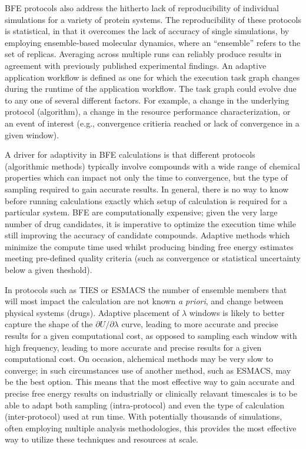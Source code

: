 \documentclass[11pt]{article}
\begin{document}
BFE protocols also address the hitherto lack of reproducibility of
individual simulations for a variety of protein systems. The
reproducibility of these protocols is statistical, in that it
overcomes the lack of accuracy of single simulations, by employing
ensemble-based molecular dynamics, where an ``ensemble'' refers to the
set of replicas. Averaging across multiple runs can reliably produce
results in agreement with previously published experimental findings.
An adaptive application workflow is defined as one for which the
execution task graph changes during the runtime of the application
workflow. The task graph could evolve due to any one of several
different factors. For example, a change in the underlying protocol
(algorithm), a change in the resource performance characterization, or
an event of interest (e.g., convergence critieria reached or lack of
convergence in a given window).

A driver for adaptivity in BFE calculations is that different protocols
(algorithmic methods) typically involve compounds with a wide range of
chemical properties which can impact not only the time to convergence, but the
type of sampling required to gain accurate results. In general, there is no
way to know before running calculations exactly which setup of calculation is
required for a particular system. BFE are computationally expensive; given the
very large number of drug candidates, it is imperative to optimize the
execution time while still improving the accuracy of candidate compounds.
Adaptive methods which minimize the compute time used whilst producing binding
free energy estimates meeting pre-defined quality criteria (such as
convergence or statistical uncertainty below a given theshold).
  
In protocols such as TIES or ESMACS the number of ensemble members that will
most impact the calculation are not known \textit{a priori}, and change
between physical systems (drugs). Adaptive placement of $\lambda$ windows is
likely to better capture the shape of the $\partial U/\partial\lambda$ curve,
leading to more accurate and precise results for a given computational cost,
as opposed to sampling each window with high frequency, leading to more
accurate and precise results for a given computational cost. On occasion,
alchemical methods may be very slow to converge; in such circumstances use of
another method, such as ESMACS, may be the best option. This means that the
most effective way to gain accurate and precise free energy results on
industrially or clinically relavant timescales is to be able to adapt both
sampling (intra-protocol) and even the type of calculation (inter-protocol)
used at run time. With potentially thousands of simulations, often employing
multiple analysis methodologies, this provides the most effective way to
utilize these techniques and resources at scale.
\end{document}
